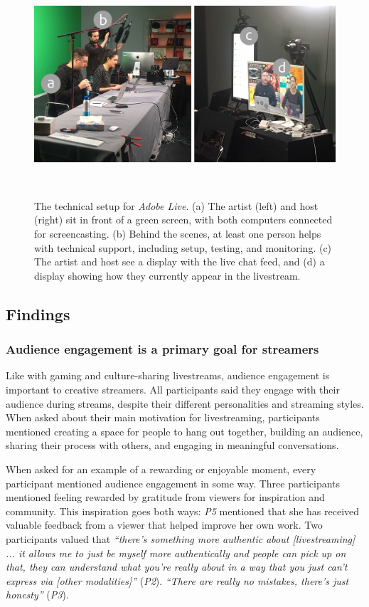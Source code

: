 \begin{figure}[t]
\centering
  \includegraphics[width=1\columnwidth]{livestreams/figures/adobelive_setup.png}
  \caption{The technical setup for \textit{Adobe Live}. (a) The artist (left) and host (right) sit in front of a green screen, with both computers connected for screencasting. (b) Behind the scenes, at least one person helps with technical support, including setup, testing, and monitoring. (c) The artist and host see a display with the live chat feed, and (d) a display showing how they currently appear in the livestream. }~\label{fig:livestream_adobelive_setup}
  \vspace{-0.2in}
\end{figure}

\subsection{Findings}
\subsubsection{Audience engagement is a primary goal for streamers}
Like with gaming \cite{Pellicone2017, Hamilton2014} and culture-sharing \cite{Lu2019} livestreams, audience engagement is important to creative streamers. All participants said they engage with their audience during streams, despite their different personalities and streaming styles. When asked about their main motivation for livestreaming, participants mentioned creating a space for people to hang out together, building an audience, sharing their process with others, and engaging in meaningful conversations.

When asked for an example of a rewarding or enjoyable moment, every participant mentioned audience engagement in some way. Three participants mentioned feeling rewarded by gratitude from viewers for inspiration and community. This inspiration goes both ways: \textit{P5} mentioned that she has received valuable feedback from a viewer that helped improve her own work. Two participants valued that \textit{``there's something more authentic about [livestreaming] ... it allows me to just be myself more authentically and people can pick up on that, they can understand what you're really about in a way that you just can't express via [other modalities]''} (\textit{P2}). \textit{``There are really no mistakes, there's just honesty''} (\textit{P3}).

